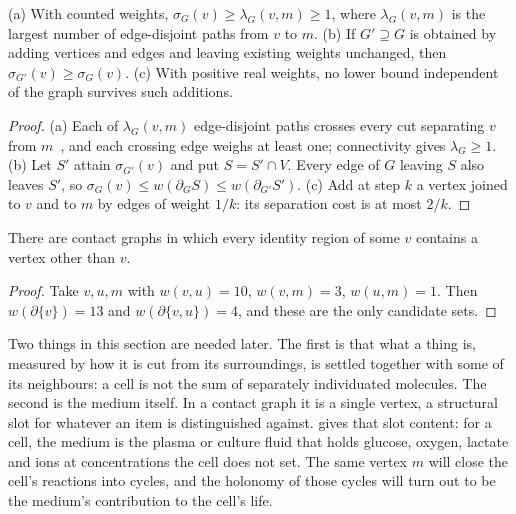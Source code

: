 \begin{theorem}
\label{c1:thm-floor}
\lnkD{} (a) With counted weights, $\sigma_G(v)\ge\lambda_G(v,m)\ge1$, where
$\lambda_G(v,m)$ is the largest number of edge-disjoint paths from $v$ to
$m$. (b) If $G'\supseteq G$ is obtained by adding vertices and edges and
leaving existing weights unchanged, then $\sigma_{G'}(v)\ge\sigma_G(v)$.
(c) With positive real weights, no lower bound independent of the graph
survives such additions.
\end{theorem}

\begin{proof}
(a) Each of $\lambda_G(v,m)$ edge-disjoint paths crosses every cut
separating $v$ from $m$~\citep{menger1927}, and each crossing edge weighs at
least one; connectivity gives $\lambda_G\ge1$. (b) Let $S'$ attain
$\sigma_{G'}(v)$ and put $S=S'\cap V$. Every edge of $G$ leaving $S$ also
leaves $S'$, so $\sigma_G(v)\le w(\partial_G S)\le w(\partial_{G'}S')$.
(c) Add at step $k$ a vertex joined to $v$ and to $m$ by edges of weight
$1/k$: its separation cost is at most $2/k$.
\end{proof}

\begin{proposition}
\label{c1:prop-region}
\lnkD{} There are contact graphs in which every identity region of some $v$
contains a vertex other than $v$.
\end{proposition}

\begin{proof}
Take $v,u,m$ with $w(v,u)=10$, $w(v,m)=3$, $w(u,m)=1$. Then
$w(\partial\{v\})=13$ and $w(\partial\{v,u\})=4$, and these are the only
candidate sets.
\end{proof}

Two things in this section are needed later. The first is that what a
thing is, measured by how it is cut from its surroundings, is settled
together with some of its neighbours: a cell is not the sum of separately
individuated molecules. The second is the medium itself. In a contact graph
it is a single vertex, a structural slot for whatever an item is
distinguished against.  gives that slot content: for a
cell, the medium is the plasma or culture fluid that holds glucose, oxygen,
lactate and ions at concentrations the cell does not set. The same vertex
$m$ will close the cell's reactions into cycles, and the holonomy of those
cycles will turn out to be the medium's contribution to the cell's life.

